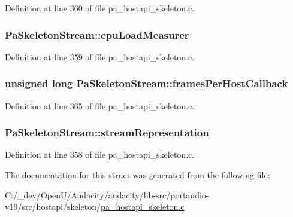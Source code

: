 Definition at line 360 of file pa\+\_\+hostapi\+\_\+skeleton.\+c.

\subsubsection[{\texorpdfstring{cpu\+Load\+Measurer}{cpuLoadMeasurer}}]{ Pa\+Skeleton\+Stream\+::cpu\+Load\+Measurer}\hypertarget{struct_pa_skeleton_stream_a08f29860fb1ea431f9a11a7592a6804b}{}\label{struct_pa_skeleton_stream_a08f29860fb1ea431f9a11a7592a6804b}


Definition at line 359 of file pa\+\_\+hostapi\+\_\+skeleton.\+c.

\subsubsection[{\texorpdfstring{frames\+Per\+Host\+Callback}{framesPerHostCallback}}]{\setlength{\rightskip}{0pt plus 5cm}unsigned long Pa\+Skeleton\+Stream\+::frames\+Per\+Host\+Callback}\hypertarget{struct_pa_skeleton_stream_a12503be191ef447234f5c53a4c53b49b}{}\label{struct_pa_skeleton_stream_a12503be191ef447234f5c53a4c53b49b}


Definition at line 365 of file pa\+\_\+hostapi\+\_\+skeleton.\+c.

\subsubsection[{\texorpdfstring{stream\+Representation}{streamRepresentation}}]{ Pa\+Skeleton\+Stream\+::stream\+Representation}\hypertarget{struct_pa_skeleton_stream_ac27b2f15cde70bca623fd136551fb39f}{}\label{struct_pa_skeleton_stream_ac27b2f15cde70bca623fd136551fb39f}


Definition at line 358 of file pa\+\_\+hostapi\+\_\+skeleton.\+c.



The documentation for this struct was generated from the following file\+:\begin{DoxyCompactItemize}
\item 
C\+:/\+\_\+dev/\+Open\+U/\+Audacity/audacity/lib-\/src/portaudio-\/v19/src/hostapi/skeleton/\hyperlink{pa__hostapi__skeleton_8c}{pa\+\_\+hostapi\+\_\+skeleton.\+c}\end{DoxyCompactItemize}
